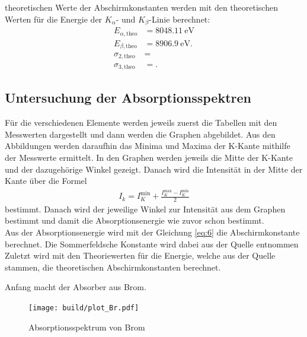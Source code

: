 \justifying theoretischen Werte der Abschirmkonstanten werden mit den theoretischen
Werten \cite{NIST} für die Energie der $K_{\alpha} $- und $K_{\beta} $-Linie berechnet:
\begin{align}
    E_{\alpha, \text{theo}}&= \SI{8048.11}{\electronvolt} \label{eq:22} \\
    E_{\beta, \text{theo}}&= \SI{8906.9}{\electronvolt}. \label{eq:23}\\
    \sigma _{2,\text{theo}} &=  \text{} \label{eq:24} \\
    \sigma _{3,\text{theo}} &=  \text{} \label{eq:25}.
\end{align}


\subsection{Untersuchung der Absorptionsspektren}

Für die verschiedenen Elemente werden jeweils zuerst die Tabellen
mit den Messwerten dargestellt und dann werden die Graphen
abgebildet.
Aus den Abbildungen werden daraufhin das Minima und Maxima der K-Kante 
mithilfe der Messwerte ermittelt.
In den Graphen werden jeweils die Mitte der K-Kante
und der dazugehörige Winkel gezeigt.
Danach wird die Intensität in der Mitte der Kante über die Formel \cite{V602}
\begin{align}
    I_k = I_K^{\text{min}}+\frac{I_K^{\text{max}}-I_K^{\text{min}}}{2} \label{eq:26}
\end{align}
bestimmt.
Danach wird der jeweilige Winkel zur Intensität aus dem Graphen bestimmt und damit
die Absorptionsenergie wie zuvor schon bestimmt. \\
Aus der Absorptionsenergie wird mit der Gleichung \eqref{eq:6} die Abschirmkonstante berechnet.
Die Sommerfeldsche Konstante wird dabei aus der Quelle \cite{ertel1935sommerfeldsche}
entnommen
Zuletzt wird mit den Theoriewerten für die Energie, welche aus der Quelle \cite{NIST}
stammen, die theoretischen Abschirmkonstanten berechnet.

\justifying Anfang macht der Absorber aus Brom.


\begin{figure}[H]
    \centering
    \texttt{[image: build/plot\_Br.pdf]}
    \caption{Absorptionsspektrum von Brom  \cite{matplotlib}}
    \label{fig:4}
\end{figure}

